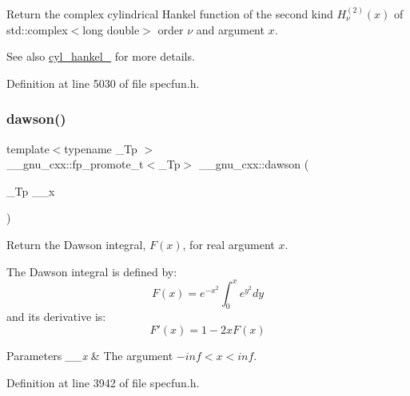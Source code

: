 Return the complex cylindrical Hankel function of the second kind $ H^{(2)}_\nu(x) $ of {\ttfamily std\+::complex$<$long double$>$} order $ \nu $ and argument $ x $.

\begin{DoxySeeAlso}{See also}
\hyperlink{group__gnu__math__spec__func_ga7ebc71dd48ac97255d72f5f5f43dfd8e}{cyl\+\_\+hankel\+\_} for more details. 
\end{DoxySeeAlso}


Definition at line 5030 of file specfun.\+h.

\mbox{\label{group__gnu__math__spec__func_gabc97cbc04fdd23593e8dccbc1421dad5}} 
\subsubsection{\texorpdfstring{dawson()}{dawson()}}
{\footnotesize\ttfamily template$<$typename \+\_\+\+Tp $>$ \\
\+\_\+\+\_\+gnu\+\_\+cxx\+::fp\+\_\+promote\+\_\+t$<$\+\_\+\+Tp$>$ \+\_\+\+\_\+gnu\+\_\+cxx\+::dawson (\begin{DoxyParamCaption}\item[{\+\_\+\+Tp}]{\+\_\+\+\_\+x }\end{DoxyParamCaption})\hspace{0.3cm}{\ttfamily [inline]}}

Return the Dawson integral, $ F(x) $, for real argument $ x $.

The Dawson integral is defined by\+: \[ F(x) = e^{-x^2}\int_0^x e^{y^2}dy \] and it\textquotesingle{}s derivative is\+: \[ F'(x) = 1 - 2xF(x) \]


\begin{DoxyParams}{Parameters}
{\em \+\_\+\+\_\+x} & The argument $ -inf < x < inf $. \\
\hline
\end{DoxyParams}


Definition at line 3942 of file specfun.\+h.

\mbox{\label{group__gnu__math__spec__func_ga0a1b8e6760b8c7869127d41d96209318}} 
